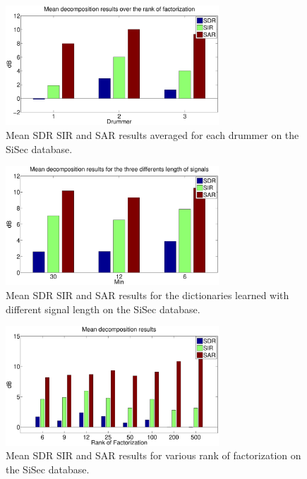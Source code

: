 \begin{figure}[t]

  \centering 
  \includegraphics[width=8cm]{fig/ResultsMeanRank}
  \caption{\label{resultsDict} Mean SDR SIR and SAR results averaged for each drummer on the SiSec database.}
  
\end{figure}

\begin{figure}[t]

  \centering 
  \includegraphics[width=8cm]{fig/ResultsMeanLength}
  \caption{\label{resultsDictLength} Mean SDR SIR and SAR results for the dictionaries learned with different signal length on the SiSec database.}
  
\end{figure}
\begin{figure}[t]

  \centering 
  \includegraphics[width=8cm]{fig/ResultsDictDrummer2}
  \caption{\label{resultsDictD2} Mean SDR SIR and SAR results for various rank of factorization on the SiSec database.}
  
\end{figure}

